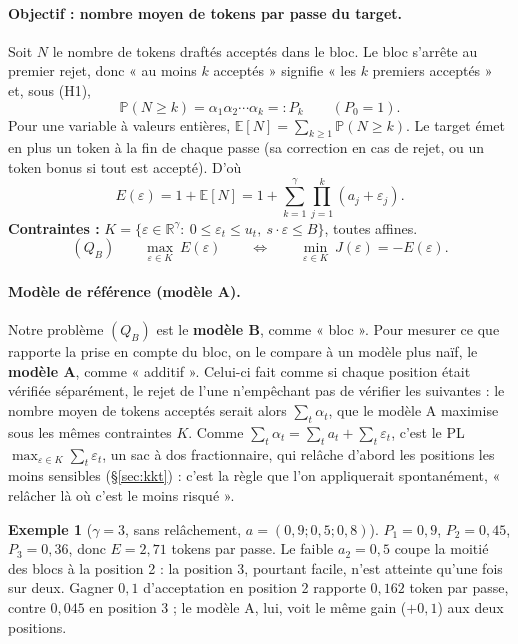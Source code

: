 \documentclass[11pt,a4paper]{article}
\newcommand{\R}{\mathbb{R}}
\newcommand{\Prob}{\mathbb{P}}
\newcommand{\Esp}{\mathbb{E}}
\theoremstyle{plain}
\theoremstyle{definition}
\newtheorem{exemple}{Exemple}
\begin{document}
\paragraph{Objectif : nombre moyen de tokens par passe du target.} Soit $N$ le nombre de tokens draftés acceptés dans le bloc. Le bloc s'arrête au premier rejet, donc « au moins $k$ acceptés » signifie « les $k$ premiers acceptés » et, sous (H1),
\[\Prob(N\ge k)=\alpha_1\alpha_2\cdots\alpha_k=:P_k\qquad(P_0=1).\]
Pour une variable à valeurs entières, $\Esp[N]=\sum_{k\ge1}\Prob(N\ge k)$. Le target émet en plus un token à la fin de chaque passe (sa correction en cas de rejet, ou un token bonus si tout est accepté). D'où
\[E(\varepsilon)=1+\Esp[N]=1+\sum_{k=1}^{\gamma}\prod_{j=1}^{k}(a_j+\varepsilon_j).\]
\textbf{Contraintes :} $K=\{\varepsilon\in\R^\gamma:\ 0\le\varepsilon_t\le u_t,\ s\cdot\varepsilon\le B\}$, toutes affines.
\[(Q_B)\qquad \max_{\varepsilon\in K}\ E(\varepsilon)\qquad\Longleftrightarrow\qquad \min_{\varepsilon\in K}\ J(\varepsilon)=-E(\varepsilon).\]
\paragraph{Modèle de référence (modèle A).} Notre problème $(Q_B)$ est le \textbf{modèle B}, comme « bloc ». Pour mesurer ce que rapporte la prise en compte du bloc, on le compare à un modèle plus naïf, le \textbf{modèle A}, comme « additif ». Celui-ci fait comme si chaque position était vérifiée séparément, le rejet de l'une n'empêchant pas de vérifier les suivantes : le nombre moyen de tokens acceptés serait alors $\sum_t\alpha_t$, que le modèle A maximise sous les mêmes contraintes $K$. Comme $\sum_t\alpha_t=\sum_ta_t+\sum_t\varepsilon_t$, c'est le PL $\max_{\varepsilon\in K}\sum_t\varepsilon_t$, un sac à dos fractionnaire, qui relâche d'abord les positions les moins sensibles (§\ref{sec:kkt}) : c'est la règle que l'on appliquerait spontanément, « relâcher là où c'est le moins risqué ».

\begin{exemple}[$\gamma=3$, sans relâchement, $a=(0{,}9;0{,}5;0{,}8)$]
$P_1=0{,}9$, $P_2=0{,}45$, $P_3=0{,}36$, donc $E=2{,}71$ tokens par passe. Le faible $a_2=0{,}5$ coupe la moitié des blocs à la position 2 : la position 3, pourtant facile, n'est atteinte qu'une fois sur deux. Gagner $0{,}1$ d'acceptation en position 2 rapporte $0{,}162$ token par passe, contre $0{,}045$ en position 3 ; le modèle A, lui, voit le même gain ($+0{,}1$) aux deux positions.
\end{exemple}
\end{document}
